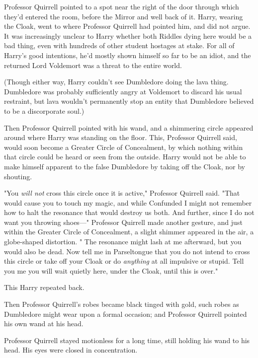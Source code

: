 Professor Quirrell pointed to a spot near the right of the door through which
they'd entered the room, before the Mirror and well back of it. Harry, wearing
the Cloak, went to where Professor Quirrell had pointed him, and did not argue.
It was increasingly unclear to Harry whether both Riddles dying here would be a
bad thing, even with hundreds of other student hostages at stake. For all of
Harry's good intentions, he'd mostly shown himself so far to be an idiot, and
the returned Lord Voldemort was a threat to the entire world.

(Though either way, Harry couldn't see Dumbledore doing the lava thing.
Dumbledore was probably sufficiently angry at Voldemort to discard his usual
restraint, but lava wouldn't permanently stop an entity that Dumbledore
believed to be a discorporate soul.)

Then Professor Quirrell pointed with his wand, and a shimmering circle appeared
around where Harry was standing on the floor. This, Professor Quirrell said,
would soon become a Greater Circle of Concealment, by which nothing within that
circle could be heard or seen from the outside. Harry would not be able to make
himself apparent to the false Dumbledore by taking off the Cloak, nor by
shouting.

"You \emph{will not} cross this circle once it is active," Professor Quirrell
said. "That would cause you to touch my magic, and while Confunded I might not
remember how to halt the resonance that would destroy us both. And further,
since I do not want you throwing shoes---" Professor Quirrell made another
gesture, and just within the Greater Circle of Concealment, a slight shimmer
appeared in the air, a globe-shaped distortion. " The resonance might lash
at me afterward, but you would also be dead. Now tell me in Parseltongue that
you do not intend to cross this circle or take off your Cloak or do
\emph{anything} at all impulsive or stupid. Tell you me you will wait quietly
here, under the Cloak, until this is over."

This Harry repeated back.

Then Professor Quirrell's robes became black tinged with gold, such robes as
Dumbledore might wear upon a formal occasion; and Professor Quirrell pointed
his own wand at his head.

Professor Quirrell stayed motionless for a long time, still holding his wand to
his head. His eyes were closed in concentration.

